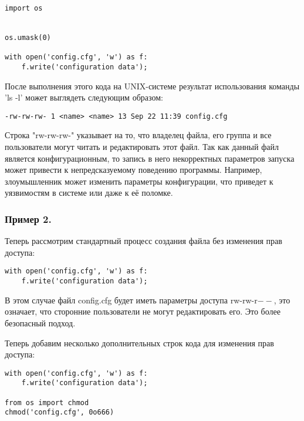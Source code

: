 \documentclass[a4paper,12pt]{article} %
\begin{document}
				\begin{lstlisting}[style=pythonstyle]
import os


os.umask(0)

with open('config.cfg', 'w') as f:
	f.write('configuration data');
				\end{lstlisting}

				\par После выполнения этого кода на UNIX-системе результат использования команды 'ls -l' может выглядеть следующим образом:

				\begin{lstlisting}
-rw-rw-rw- 1 <name> <name> 13 Sep 22 11:39 config.cfg
				\end{lstlisting}

				\par Строка "rw-rw-rw-" указывает на то, что владелец файла, его группа и все пользователи могут читать и редактировать этот файл. Так как данный файл является конфигурационным, то запись в него некорректных параметров запуска может привести к непредсказуемому поведению программы. Например, злоумышленник может изменить параметры конфигурации, что приведет к уязвимостям в системе или даже к её поломке.

			\subsubsection{Пример 2.}
				Теперь рассмотрим стандартный процесс создания файла без изменения прав доступа:

				\begin{lstlisting}[style=pythonstyle]
with open('config.cfg', 'w') as f:
    f.write('configuration data');
                \end{lstlisting}

				\par В этом случае файл config.cfg будет иметь параметры доступа rw-rw-r$--$, это означает, что сторонние пользователи не могут редактировать его. Это более безопасный подход.

				\par Теперь добавим несколько дополнительных строк кода для изменения прав доступа:

				\begin{lstlisting}[style=pythonstyle]
with open('config.cfg', 'w') as f:
    f.write('configuration data');

from os import chmod
chmod('config.cfg', 0o666)
                \end{lstlisting}
\end{document}
